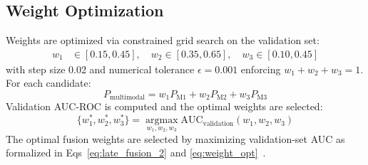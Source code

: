 \documentclass[10pt,letterpaper]{article}
\begin{document}
                                                                                                                  \subsection*{Weight Optimization}
                                                                                                                  Weights are optimized via constrained grid search on the validation set:
                                                                                                                  \begin{align}
                                                                                                                  w_1 &\in [0.15,0.45],\quad
                                                                                                                  w_2 \in [0.35,0.65],\quad
                                                                                                                  w_3 \in [0.10,0.45]
                                                                                                                  \end{align}
                                                                                                                  with step size 0.02 and numerical tolerance $\epsilon=0.001$ enforcing $w_1+w_2+w_3=1$. For each candidate:
                                                                                                                  \begin{equation}
                                                                                                                  \label{eq:late_fusion_2}
                                                                                                                  P_{\text{multimodal}} = w_1 P_{\text{M1}} + w_2 P_{\text{M2}} + w_3 P_{\text{M3}}
                                                                                                                  \end{equation}
                                                                                                                  Validation AUC-ROC is computed and the optimal weights are selected:
                                                                                                                   \begin{equation} 
                                                                                                                   \label{eq:weight_opt}
                                                                                                                   \{w_1^*, w_2^*, w_3^*\} = \operatorname*{argmax}_{w_1,w_2,w_3}\text{AUC}_{\text{validation}}(w_1,w_2,w_3) 
                                                                                                                   \end{equation}
                                                                                                                  The optimal fusion weights are selected by maximizing validation-set AUC as formalized in Eqs~\ref{eq:late_fusion_2} and \ref{eq:weight_opt}~\cite{ref59}.
\end{document}
